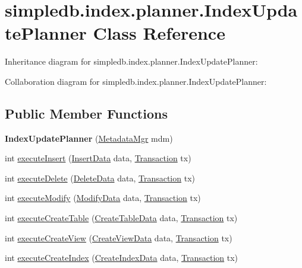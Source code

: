 \hypertarget{classsimpledb_1_1index_1_1planner_1_1IndexUpdatePlanner}{}\section{simpledb.\+index.\+planner.\+Index\+Update\+Planner Class Reference}
\label{classsimpledb_1_1index_1_1planner_1_1IndexUpdatePlanner}


Inheritance diagram for simpledb.\+index.\+planner.\+Index\+Update\+Planner\+:


Collaboration diagram for simpledb.\+index.\+planner.\+Index\+Update\+Planner\+:
\subsection*{Public Member Functions}
\begin{DoxyCompactItemize}
\item 
\mbox{\label{classsimpledb_1_1index_1_1planner_1_1IndexUpdatePlanner_a9bce5d4dff76928fc431cbda2ad01300}} 
{\bfseries Index\+Update\+Planner} (\hyperlink{classsimpledb_1_1metadata_1_1MetadataMgr}{Metadata\+Mgr} mdm)
\item 
int \hyperlink{classsimpledb_1_1index_1_1planner_1_1IndexUpdatePlanner_ab6e0638b0692e80ec5685ce0b75214a9}{execute\+Insert} (\hyperlink{classsimpledb_1_1parse_1_1InsertData}{Insert\+Data} data, \hyperlink{classsimpledb_1_1tx_1_1Transaction}{Transaction} tx)
\item 
int \hyperlink{classsimpledb_1_1index_1_1planner_1_1IndexUpdatePlanner_abc99996e4228128a9ce3a1588a35722a}{execute\+Delete} (\hyperlink{classsimpledb_1_1parse_1_1DeleteData}{Delete\+Data} data, \hyperlink{classsimpledb_1_1tx_1_1Transaction}{Transaction} tx)
\item 
int \hyperlink{classsimpledb_1_1index_1_1planner_1_1IndexUpdatePlanner_a540a81b73146d9d7b1404d62cfcf13ff}{execute\+Modify} (\hyperlink{classsimpledb_1_1parse_1_1ModifyData}{Modify\+Data} data, \hyperlink{classsimpledb_1_1tx_1_1Transaction}{Transaction} tx)
\item 
int \hyperlink{classsimpledb_1_1index_1_1planner_1_1IndexUpdatePlanner_a530ca9f0043be30f228ccaf7d99ce0bb}{execute\+Create\+Table} (\hyperlink{classsimpledb_1_1parse_1_1CreateTableData}{Create\+Table\+Data} data, \hyperlink{classsimpledb_1_1tx_1_1Transaction}{Transaction} tx)
\item 
int \hyperlink{classsimpledb_1_1index_1_1planner_1_1IndexUpdatePlanner_aa1ce4cdb68a43048a7809b08a28149f0}{execute\+Create\+View} (\hyperlink{classsimpledb_1_1parse_1_1CreateViewData}{Create\+View\+Data} data, \hyperlink{classsimpledb_1_1tx_1_1Transaction}{Transaction} tx)
\item 
int \hyperlink{classsimpledb_1_1index_1_1planner_1_1IndexUpdatePlanner_ad743dd19ed44d8b11338ddcd49bf861a}{execute\+Create\+Index} (\hyperlink{classsimpledb_1_1parse_1_1CreateIndexData}{Create\+Index\+Data} data, \hyperlink{classsimpledb_1_1tx_1_1Transaction}{Transaction} tx)
\end{DoxyCompactItemize}


